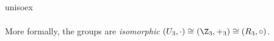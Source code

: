 \begin{examples}{}{unisoex}
\begin{enumerate}
\[\begin{array}{c||c|c|c}
			\end{array}
		\]
		More formally, the groups are \emph{isomorphic} $(U_3,\cdot)\cong (\Z_3,+_3)\cong (R_3,\circ)$.%
	\end{enumerate}
\end{examples}

\vfil

